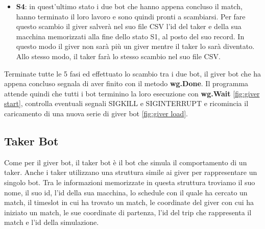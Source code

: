\documentclass[main.tex]{subfiles}
\begin{document}
\begin{itemize}
    \item \textbf{S4}: in quest'ultimo stato i due bot che hanno appena concluso il match, hanno terminato il loro lavoro e sono quindi pronti a scambiarsi. Per fare questo scambio il giver salverà nel suo file CSV l'id del taker e della sua macchina memorizzati alla fine dello stato S1, al posto del suo record. In questo modo il giver non sarà più un giver mentre il taker lo sarà diventato. Allo stesso modo, il taker farà lo stesso scambio nel suo file CSV.

    
    
\end{itemize}
Terminate tutte le 5 fasi ed effettuato lo scambio tra i due bot, il giver bot che ha appena concluso segnala di aver finito con il metodo \textbf{wg.Done}. Il programma attende quindi che tutti i bot terminino la loro esecuzione con \textbf{wg.Wait} \ref{fig:giver start}, controlla eventuali segnali SIGKILL e SIGINTERRUPT e ricomincia il caricamento di una nuova serie di giver bot \ref{fig:giver load}. 


\subsection{Taker Bot}\label{sec:taker-bot}
Come per il giver bot, il taker bot è il bot che simula il comportamento di un taker. Anche i taker utilizzano una struttura simile ai giver per rappresentare un singolo bot. Tra le informazioni memorizzate in questa struttura troviamo il suo nome, il suo id, l’id della sua macchina, lo schedule con il quale ha cercato un match, il timeslot in cui ha trovato un
match, le coordinate del giver con cui ha iniziato un match, le sue coordinate di partenza, l'id del trip che rappresenta il match e l'id della simulazione.


\end{document}
